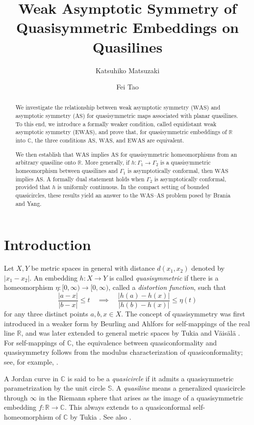 \documentclass[11pt]{amsart}
\title[Asymptotic symmetry of quasilines]
{Weak Asymptotic Symmetry of Quasisymmetric Embeddings on Quasilines}
\author{Katsuhiko Matsuzaki}
\author{Fei Tao}
\date{}
\numberwithin{equation}{section}
\theoremstyle{definition} %
\theoremstyle{remarkstyle}
\begin{document}
\begin{abstract}
We investigate the relationship between weak asymptotic symmetry ($\mathrm{WAS}$) and asymptotic symmetry ($\mathrm{AS}$) for quasisymmetric maps associated with planar quasilines. To this end, we introduce a formally weaker condition, called equidistant weak asymptotic symmetry ($\mathrm{EWAS}$), and prove that, for quasisymmetric embeddings of $\mathbb{R}$ into $\mathbb{C}$, the three conditions $\mathrm{AS}$, $\mathrm{WAS}$, and $\mathrm{EWAS}$ are equivalent.

We then establish that $\mathrm{WAS}$ implies $\mathrm{AS}$ for quasisymmetric homeomorphisms from an arbitrary quasiline onto $\mathbb{R}$. More generally, if $h\colon\Gamma_1\to\Gamma_2$ is a quasisymmetric homeomorphism between quasilines and $\Gamma_1$ is asymptotically conformal, then $\mathrm{WAS}$ implies $\mathrm{AS}$. A formally dual statement holds when $\Gamma_2$ is asymptotically conformal, provided that $h$ is uniformly continuous. In the compact setting of bounded quasicircles, these results yield an answer to the $\mathrm{WAS}$--$\mathrm{AS}$ problem posed by Brania and Yang.
\end{abstract}

\maketitle

\section{Introduction}
Let $X,Y$ be metric spaces in general with distance $d(x_1,x_2)$ denoted by $|x_1-x_2|$. 
An embedding $h\colon X\to Y$ is called \emph{quasisymmetric} if there is a homeomorphism $\eta\colon[0,\infty)\to[0,\infty)$, called a \emph{distortion function}, such that
\[
 \frac{|a-x|}{|b-x|}\leq t\quad\implies\quad\frac{|h(a)-h(x)|}{|h(b)-h(x)|}\le\eta(t)
\]
for any three distinct points $a,b,x\in X$. 
The concept of quasisymmetry was first introduced in a weaker form
by Beurling and Ahlfors \cite{BA} for self-mappings of the real line $\mathbb{R}$,
and was later extended to general metric spaces by Tukia and V\"ais\"al\"a \cite{TukiaVaisala}. 
For self-mappings of $\mathbb C$, the equivalence between quasiconformality and quasisymmetry follows from the modulus characterization of quasiconformality; see, for example, \cite{LV71, AIM}. 

A Jordan curve in $\mathbb C$ is said to be a \emph{quasicircle} if 
it admits a quasisymmetric parametrization by the unit circle $\mathbb S$.
A \emph{quasiline} means a generalized quasicircle through $\infty$ in the Riemann sphere that arises as the image of a quasisymmetric embedding $f\colon\mathbb R\to \mathbb{C}$. 
This always extends to a quasiconformal self-homeomorphism of $\mathbb C$ by Tukia \cite{TukiaExtension}.
See also \cite[Proposition~5.10 and Theorem~5.11]{Pom}.
\end{document}
